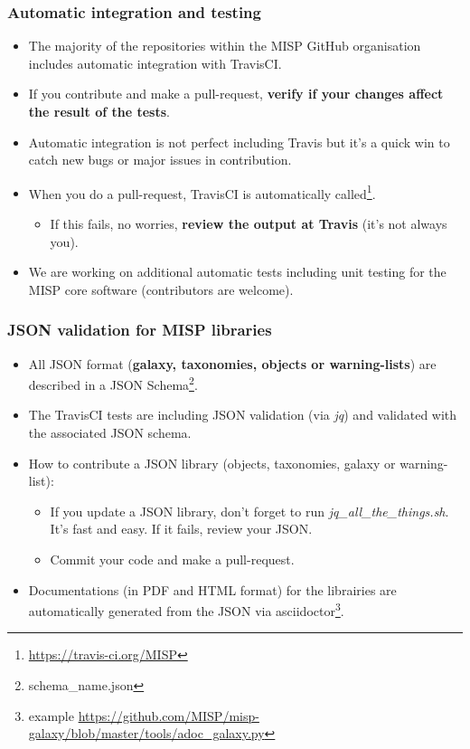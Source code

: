\begin{frame}[fragile]
\frametitle{Automatic integration and testing}
\begin{itemize}
\item The majority of the repositories within the MISP GitHub organisation includes automatic integration with TravisCI.
\item If you contribute and make a pull-request, {\bf verify if your changes affect the result of the tests}.
\item Automatic integration is not perfect including Travis but it's a quick win to catch new bugs or major issues in contribution.
\item When you do a pull-request, TravisCI is automatically called\footnote{\url{https://travis-ci.org/MISP}}.
\begin{itemize}
\item If this fails, no worries, {\bf review the output at Travis} (it's not always you).
\end{itemize}
\item We are working on additional automatic tests including unit testing for the MISP core software (contributors are welcome).
\end{itemize}
\end{frame}

\begin{frame}[fragile]
\frametitle{JSON validation for MISP libraries}
\begin{itemize}
\item All JSON format ({\bf galaxy, taxonomies, objects or warning-lists}) are described in a JSON Schema\footnote{schema\_name.json}.
\item The TravisCI tests are including JSON validation (via \emph{jq}) and validated with the associated JSON schema.
\item How to contribute a JSON library (objects, taxonomies, galaxy or warning-list):
\begin{itemize}
\item If you update a JSON library, don't forget to run \emph{jq\_all\_the\_things.sh}. It's fast and easy. If it fails, review your JSON.
\item Commit your code and make a pull-request.
\end{itemize}
\item Documentations (in PDF and HTML format) for the librairies are automatically generated from the JSON via asciidoctor\footnote{example \url{https://github.com/MISP/misp-galaxy/blob/master/tools/adoc_galaxy.py}}.
\end{itemize}
\end{frame}

